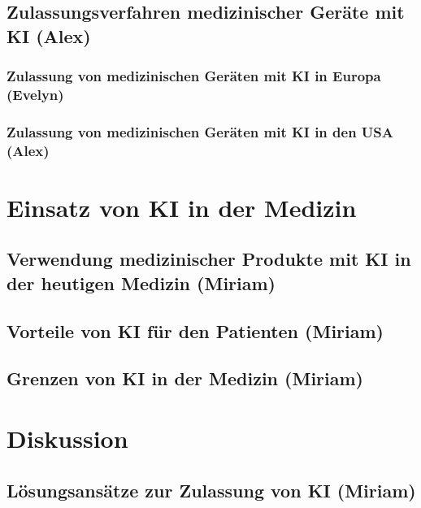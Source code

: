 \documentclass[a4paper, 11pt]{article}
\begin{document}
		\subsection{Zulassungsverfahren medizinischer Geräte mit KI \small{(Alex)}}\label{sec:medproductsAI}
						
			\subsubsection{Zulassung von medizinischen Geräten mit KI in Europa \small{(Evelyn)}}\label{sec:europe-with-ai}
				
			\subsubsection{Zulassung von medizinischen Geräten mit KI in den USA \small{(Alex)}}\label{sec:us-with-ai}
				
				
				

	\newpage
	\section{Einsatz von KI in der Medizin}\label{sec:analysis}
				
			\subsection{Verwendung medizinischer Produkte mit KI in der heutigen Medizin \small{(Miriam)}}\label{sec:ki-today}
				
			\subsection{Vorteile von KI für den Patienten \small{(Miriam)}}\label{sec:ki-advantages}
				
			\subsection{Grenzen von KI in der Medizin  \small{(Miriam)}}\label{sec:ki-limitations}
				
	\newpage
	\section{Diskussion}\label{sec:discussion}
		
		\subsection{Lösungsansätze zur Zulassung von KI  \small{(Miriam)}} \label{sec:solutions}
			
\end{document}
